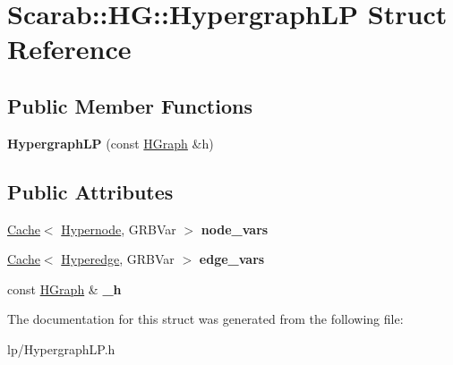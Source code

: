 \hypertarget{struct_scarab_1_1_h_g_1_1_hypergraph_l_p}{
\section{Scarab::HG::HypergraphLP Struct Reference}
\label{struct_scarab_1_1_h_g_1_1_hypergraph_l_p}
}
\subsection*{Public Member Functions}
\begin{DoxyCompactItemize}
\item 
\hypertarget{struct_scarab_1_1_h_g_1_1_hypergraph_l_p_a332edf79e5fc5b617ec6e948a73cc4a4}{
{\bfseries HypergraphLP} (const \hyperlink{class_scarab_1_1_h_g_1_1_h_graph}{HGraph} \&h)}
\label{struct_scarab_1_1_h_g_1_1_hypergraph_l_p_a332edf79e5fc5b617ec6e948a73cc4a4}

\end{DoxyCompactItemize}
\subsection*{Public Attributes}
\begin{DoxyCompactItemize}
\item 
\hypertarget{struct_scarab_1_1_h_g_1_1_hypergraph_l_p_ae9c9c441b112e98e412e8129e91a28ce}{
\hyperlink{class_cache}{Cache}$<$ \hyperlink{class_scarab_1_1_h_g_1_1_hypernode}{Hypernode}, GRBVar $>$ {\bfseries node\_\-vars}}
\label{struct_scarab_1_1_h_g_1_1_hypergraph_l_p_ae9c9c441b112e98e412e8129e91a28ce}

\item 
\hypertarget{struct_scarab_1_1_h_g_1_1_hypergraph_l_p_a8e71b062f3d6691eef27bb85c718604f}{
\hyperlink{class_cache}{Cache}$<$ \hyperlink{class_scarab_1_1_h_g_1_1_hyperedge}{Hyperedge}, GRBVar $>$ {\bfseries edge\_\-vars}}
\label{struct_scarab_1_1_h_g_1_1_hypergraph_l_p_a8e71b062f3d6691eef27bb85c718604f}

\item 
\hypertarget{struct_scarab_1_1_h_g_1_1_hypergraph_l_p_a52fa717afa9c902f7d8ef3adf18c5204}{
const \hyperlink{class_scarab_1_1_h_g_1_1_h_graph}{HGraph} \& {\bfseries \_\-h}}
\label{struct_scarab_1_1_h_g_1_1_hypergraph_l_p_a52fa717afa9c902f7d8ef3adf18c5204}

\end{DoxyCompactItemize}


The documentation for this struct was generated from the following file:\begin{DoxyCompactItemize}
\item 
lp/HypergraphLP.h\end{DoxyCompactItemize}
